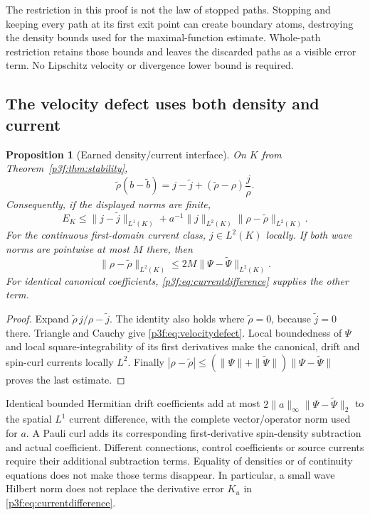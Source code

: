\documentclass[11pt]{article}
\numberwithin{equation}{section}
\newtheorem{proposition}[theorem]{Proposition}
\theoremstyle{definition}
\theoremstyle{remark}
\begin{document}
The restriction in this proof is not the law of stopped paths.
Stopping and keeping every path at its first exit point can create
boundary atoms, destroying the density bounds used for the
maximal-function estimate. Whole-path restriction retains those
bounds and leaves the discarded paths as a visible error term.
No Lipschitz velocity or divergence lower bound is required.

\subsection{The velocity defect uses both density and current}

\begin{proposition}[Earned density/current interface]
\label{p3f:prop:velocitydefect}
On $K$ from Theorem~\ref{p3f:thm:stability},
\begin{equation}\label{p3f:eq:velocityidentity}
 \widetilde\rho(b-\widetilde b)
 =j-\widetilde j+(\widetilde\rho-\rho)\frac{j}{\rho}.
\end{equation}
Consequently, if the displayed norms are finite,
\begin{equation}\label{p3f:eq:velocitydefect}
 E_K\leq
 \|j-\widetilde j\|_{L^1(K)}
  +a^{-1}\|j\|_{L^2(K)}
               \|\rho-\widetilde\rho\|_{L^2(K)}.
\end{equation}
For the continuous first-domain current class,
$j\in L^2(K)$ locally. If both wave norms are pointwise at most
$M$ there, then
\[
 \|\rho-\widetilde\rho\|_{L^2(K)}
 \leq 2M\|\Psi-\widetilde\Psi\|_{L^2(K)}.
\]
For identical canonical coefficients,
\eqref{p3f:eq:currentdifference} supplies the other term.
\end{proposition}

\begin{proof}
Expand $\widetilde\rho\,j/\rho-\widetilde j$. The identity also
holds where $\widetilde\rho=0$, because
$\widetilde j=0$ there. Triangle and Cauchy give
\eqref{p3f:eq:velocitydefect}. Local boundedness of $\Psi$ and
local square-integrability of its first derivatives make the
canonical, drift and spin-curl currents locally $L^2$.
Finally $|\rho-\widetilde\rho|\leq
(\|\Psi\|+\|\widetilde\Psi\|)\|\Psi-\widetilde\Psi\|$
proves the last estimate.
\end{proof}

Identical bounded Hermitian drift coefficients add at most
$2\|a\|_\infty\|\Psi-\widetilde\Psi\|_2$ to the spatial $L^1$
current difference, with the complete vector/operator norm used
for $a$. A Pauli curl adds its corresponding first-derivative
spin-density subtraction and actual coefficient. Different
connections, control coefficients or source currents require
their additional subtraction terms. Equality of densities or of
continuity equations does not make those terms disappear.
In particular, a small wave Hilbert norm does not replace the
derivative error $K_u$ in \eqref{p3f:eq:currentdifference}.
\end{document}
